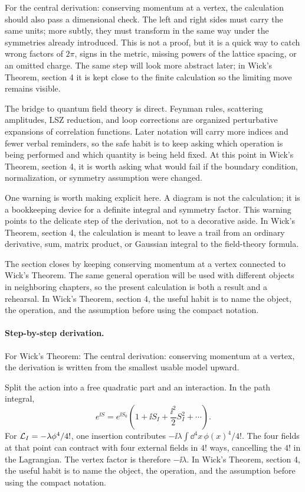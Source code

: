 For the central derivation: conserving momentum at a vertex, the calculation should also pass a dimensional check.  The left and right sides must carry the same units; more subtly, they must transform in the same way under the symmetries already introduced.  This is not a proof, but it is a quick way to catch wrong factors of \(2\pi\), signs in the metric, missing powers of the lattice spacing, or an omitted charge.  The same step will look more abstract later; in Wick's Theorem, section 4 it is kept close to the finite calculation so the limiting move remains visible.

The bridge to quantum field theory is direct.  Feynman rules, scattering amplitudes, LSZ reduction, and loop corrections are organized perturbative expansions of correlation functions.  Later notation will carry more indices and fewer verbal reminders, so the safe habit is to keep asking which operation is being performed and which quantity is being held fixed.  At this point in Wick's Theorem, section 4, it is worth asking what would fail if the boundary condition, normalization, or symmetry assumption were changed.

One warning is worth making explicit here.  A diagram is not the calculation; it is a bookkeeping device for a definite integral and symmetry factor.  This warning points to the delicate step of the derivation, not to a decorative aside.  In Wick's Theorem, section 4, the calculation is meant to leave a trail from an ordinary derivative, sum, matrix product, or Gaussian integral to the field-theory formula.

The section closes by keeping conserving momentum at a vertex connected to Wick's Theorem.  The same general operation will be used with different objects in neighboring chapters, so the present calculation is both a result and a rehearsal.  In Wick's Theorem, section 4, the useful habit is to name the object, the operation, and the assumption before using the compact notation.



\paragraph{Step-by-step derivation.}

For Wick's Theorem: The central derivation: conserving momentum at a vertex, the derivation is written from the smallest usable model upward.

Split the action into a free quadratic part and an interaction.  In the path integral,
\[
  e^{\ii S}=e^{\ii S_0}\left(1+\ii S_I+\frac{\ii^2}{2}S_I^2+\cdots\right).
\]
For \(\mathcal L_I=-\lambda\phi^4/4!\), one insertion contributes \(-\ii\lambda\int\dd^4x\,\phi(x)^4/4!\).  The four fields at that point can contract with four external fields in \(4!\) ways, cancelling the \(4!\) in the Lagrangian.  The vertex factor is therefore \(-\ii\lambda\).  In Wick's Theorem, section 4, the useful habit is to name the object, the operation, and the assumption before using the compact notation.

